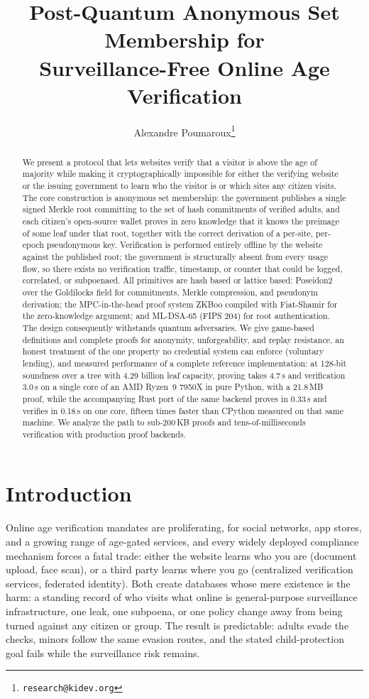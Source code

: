 \documentclass[11pt]{article}
\title{Post-Quantum Anonymous Set Membership for\\
Surveillance-Free Online Age Verification}
\author{Alexandre Poumaroux\thanks{\texttt{research@kidev.org}}}
\date{}
\theoremstyle{definition}
\begin{document}
\maketitle

\begin{abstract}
We present a protocol that lets websites verify that a visitor is above the age of
majority while making it cryptographically impossible for either the verifying website or
the issuing government to learn who the visitor is or which sites any citizen visits. The
core construction is anonymous set membership: the government publishes a single signed
Merkle root committing to the set of hash commitments of verified adults, and each
citizen's open-source wallet proves in zero knowledge that it knows the preimage of some
leaf under that root, together with the correct derivation of a per-site, per-epoch
pseudonymous key. Verification is performed entirely offline by the website against the
published root; the government is structurally absent from every usage flow, so there
exists no verification traffic, timestamp, or counter that could be logged, correlated, or
subpoenaed. All primitives are hash based or lattice based: Poseidon2 over the Goldilocks
field for commitments, Merkle compression, and pseudonym derivation; the MPC-in-the-head
proof system ZKBoo compiled with Fiat-Shamir for the zero-knowledge argument; and
ML-DSA-65 (FIPS 204) for root authentication. The design consequently withstands quantum
adversaries. We give game-based definitions and complete proofs for anonymity,
unforgeability, and replay resistance, an honest treatment of the one property no
credential system can enforce (voluntary lending), and measured performance of a complete
reference implementation: at 128-bit soundness over a tree with 4.29 billion leaf
capacity, proving takes 4.7\,s and verification 3.0\,s on a single core of an AMD Ryzen~9 7950X in pure
Python, with a 21.8\,MB proof, while the accompanying Rust port of the same backend proves
in 0.33\,s and verifies in 0.18\,s on one core, fifteen times faster than CPython measured
on that same machine. We analyze the path to sub-200\,KB proofs and tens-of-milliseconds
verification with production proof backends.
\end{abstract}

\section{Introduction}

Online age verification mandates are proliferating, for social networks, app stores, and
a growing range of age-gated services, and every widely deployed compliance mechanism
forces a fatal trade: either the website learns who you are (document upload, face scan),
or a third party learns where you go (centralized verification services, federated
identity). Both create databases whose mere existence is the harm: a standing record of
who visits what online is general-purpose surveillance infrastructure, one leak, one
subpoena, or one policy change away from being turned against any citizen or group. The
result is predictable: adults evade the checks, minors follow the same evasion routes, and
the stated child-protection goal fails while the surveillance risk remains.
\end{document}
